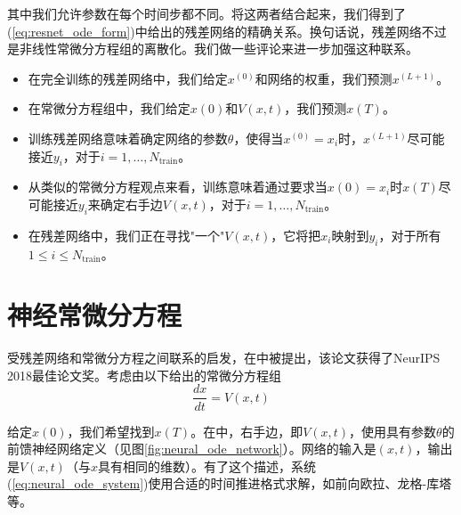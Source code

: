 其中我们允许参数在每个时间步都不同。将这两者结合起来，我们得到了(\ref{eq:resnet_ode_form})中给出的残差网络的精确关系。换句话说，残差网络不过是非线性常微分方程组的离散化。我们做一些评论来进一步加强这种联系。

\begin{itemize}
\item 在完全训练的残差网络中，我们给定$x^{(0)}$和网络的权重，我们预测$x^{(L+1)}$。

\item 在常微分方程组中，我们给定$x(0)$和$V(x, t)$，我们预测$x(T)$。

\item 训练残差网络意味着确定网络的参数$\theta$，使得当$x^{(0)} = x_i$时，$x^{(L+1)}$尽可能接近$y_i$，对于$i = 1, \ldots, N_{\text{train}}$。

\item 从类似的常微分方程观点来看，训练意味着通过要求当$x(0) = x_i$时$x(T)$尽可能接近$y_i$来确定右手边$V(x, t)$，对于$i = 1, \ldots, N_{\text{train}}$。

\item 在残差网络中，我们正在寻找"一个"$V(x, t)$，它将把$x_i$映射到$y_i$，对于所有$1 \leq i \leq N_{\text{train}}$。
\end{itemize}

\section{神经常微分方程}
\label{sec:neural_odes}

受残差网络和常微分方程之间联系的启发，在\cite{chen2018}中被提出，该论文获得了NeurIPS 2018最佳论文奖。考虑由以下给出的常微分方程组
\begin{equation}
\frac{dx}{dt} = V(x, t)
\label{eq:neural_ode_system}
\end{equation}

给定$x(0)$，我们希望找到$x(T)$。在\cite{chen2018}中，右手边，即$V(x, t)$，使用具有参数$\theta$的前馈神经网络定义（见图\ref{fig:neural_ode_network}）。网络的输入是$(x, t)$，输出是$V(x, t)$（与$x$具有相同的维数）。有了这个描述，系统(\ref{eq:neural_ode_system})使用合适的时间推进格式求解，如前向欧拉、龙格-库塔等。

